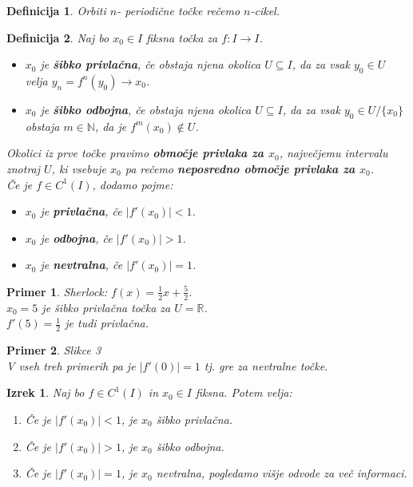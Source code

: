\documentclass{article}
\newtheorem{definicija}{Definicija}
\newtheorem{primer}{Primer}
\newtheorem{izrek}{Izrek}
\newcommand{\N}{\mathbb{N}}
\newcommand{\R}{\mathbb{R}}
\begin{document}
\begin{definicija}
Orbiti $n$- periodične točke rečemo $n$-cikel.
\end{definicija}

\begin{definicija}
Naj bo $x_0 \in I$ fiksna točka za $f:I \rightarrow I$.
\begin{itemize}
\item $x_0$ je \textbf{šibko privlačna}, če obstaja njena okolica $U\subseteq I$, da za vsak $y_0 \in U$ velja $y_n = f^n(y_0) \rightarrow x_0$.
\item $x_0$ je \textbf{šibko odbojna}, če obstaja njena okolica $U\subseteq I$, da za vsak $y_0 \in U\slash\{x_0\}$ obstaja $m\in \N$, da je $f^m(x_0) \not\in U$.
\end{itemize}
Okolici iz prve točke pravimo \textbf{območje privlaka za $x_0$}, največjemu intervalu znotraj $U$, ki vsebuje $x_0$ pa rečemo \textbf{neposredno območje privlaka za $x_0$}.\\ 
Če je $f \in C^1(I)$, dodamo pojme:
\begin{itemize}
\item $x_0$ je \textbf{privlačna}, če $|f'(x_0)| < 1$.
\item $x_0$ je \textbf{odbojna}, če $|f'(x_0)| > 1$.
\item $x_0$ je \textbf{nevtralna}, če $|f'(x_0)| = 1$.
\end{itemize} 
\end{definicija}

\begin{primer}
Sherlock: $f(x) = \frac{1}{2}x + \frac{5}{2}$.\\ 
$x_0 = 5$ je šibko privlačna točka za $U = \R$.\\ 
$f'(5) = \frac{1}{2}$ je tudi privlačna.
\end{primer}

\begin{primer}
Slikce 3\\ 
V vseh treh primerih pa je $|f'(0)| = 1$ tj. gre za nevtralne točke.
\end{primer}

\begin{izrek}
Naj bo $f\in C^1(I)$ in $x_0 \in I$ fiksna. Potem velja:
\begin{enumerate}
\item[i)] Če je $|f'(x_0)| < 1$, je $x_0$ šibko privlačna.
\item[ii)] Če je $|f'(x_0)| > 1$, je $x_0$ šibko odbojna. 
\item[iii)] Če je $|f'(x_0)| = 1$, je $x_0$ nevtralna, pogledamo višje odvode za več informaci.
\end{enumerate}
\end{izrek}
\end{document}
